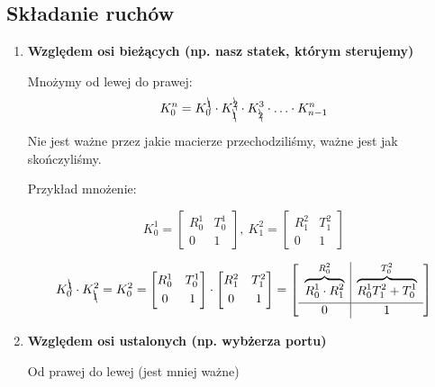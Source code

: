\documentclass{article}
\begin{document}
\subsection{Składanie ruchów}

\Large
\begin{enumerate}
    \item {\bf Względem osi bieżących (np. nasz statek, którym sterujemy)}

          Mnożymy od lewej do prawej:
          $$
              K_{0}^{n} = K_{0}^{\bcancel{1}}\cdot K_{\bcancel{1}}^{\bcancel{2}} \cdot K_{\bcancel{2}}^{3} \cdot \ldots \cdot K_{n-1}^{n}
          $$

          Nie jest ważne przez jakie macierze przechodziliśmy, ważne jest jak skończyliśmy.


          Przykład mnożenie:

          $$
              K_{0}^{1} =
              \begin{bmatrix}
                  R_{0}^{1} & T_{0}^{1} \\[0.3em]
                  0         & 1
              \end{bmatrix}
              , \
              K_{1}^{2} =
              \begin{bmatrix}
                  R_{1}^{2} & T_{1}^{2} \\[0.3em]
                  0         & 1
              \end{bmatrix}
          $$

          $$
              K_{0}^{\bcancel{1}}\cdot K_{\bcancel{1}}^{2} = K_{0}^{2} =
              \begin{bmatrix}
                  R_{0}^{1} & T_{0}^{1} \\[0.3em]
                  0         & 1
              \end{bmatrix}
              \cdot
              \begin{bmatrix}
                  R_{1}^{2} & T_{1}^{2} \\[0.3em]
                  0         & 1
              \end{bmatrix}
              =
              \begin{bmatrix}
                  \begin{array}{c|c}
                      \overbrace{R_{0}^{1}\cdot R_{1}^{2}}^{R_{0}^{2}} & \overbrace{R_{0}^{1}T_{1}^{2}+T_{0}^{1}}^{T_{0}^{2}} \\[0.3em]
                      \hline
                      0                                                & 1
                  \end{array}
              \end{bmatrix}
          $$



    \item {\bf Względem osi ustalonych (np. wybżerza portu)}

          Od prawej do lewej (jest mniej ważne)

\end{enumerate}
\normalsize
\end{document}
